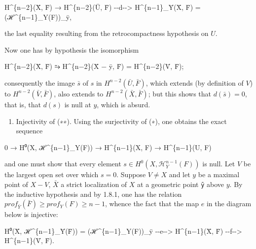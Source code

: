 \documentclass[
  11pt,
  a4paper,
]{book}
\newenvironment{Shaded}{}{}
\newcommand{\NormalTok}[1]{#1}
\providecommand{\tightlist}{%
  \setlength{\itemsep}{0pt}\setlength{\parskip}{0pt}}
\begin{document}
\begin{Shaded}
\begin{Highlighting}[]
\NormalTok{H\^{}\{n−2\}(X̄, F̄) → H\^{}\{n−2\}(Ū, F̄) {-}{-}d{-}{-}\textgreater{} H\^{}\{n−1\}\_Ȳ(X̄, F̄) = (ℋ\^{}\{n−1\}\_Y(F))\_ȳ,}
\end{Highlighting}
\end{Shaded}

the last equality resulting from the retrocompactness hypothesis on
\(U\).

Now one has by hypothesis the isomorphism

\begin{Shaded}
\begin{Highlighting}[]
\NormalTok{H\^{}\{n−2\}(X̄, F̄) ⥲ H\^{}\{n−2\}(X̄ − ȳ, F̄) = H\^{}\{n−2\}(V̄, F̄);}
\end{Highlighting}
\end{Shaded}

consequently the image \(\bar{s}\) of \(s\) in
\(H^{n-2}(\bar{U}, \bar{F})\), which extends (by definition of \(V\)) to
\(H^{n-2}(\bar{V}, \bar{F})\), also extends to
\(H^{n-2}(\bar{X}, \bar{F})\); but this shows that \(d(\bar{s}) = 0\),
that is, that \(d(s)\) is null at \(y\), which is absurd.

\begin{enumerate}
\def\labelenumi{\alph{enumi})}
\setcounter{enumi}{1}
\tightlist
\item
  Injectivity of (∗∗). Using the surjectivity of (∗), one obtains the
  exact sequence
\end{enumerate}

\begin{Shaded}
\begin{Highlighting}[]
\NormalTok{0 → H⁰(X, ℋ\^{}\{n−1\}\_Y(F)) → H\^{}\{n−1\}(X, F) → H\^{}\{n−1\}(U, F)}
\end{Highlighting}
\end{Shaded}

and one must show that every element
\(s \in H^{0}(X, \mathcal{H}^{n-1}_{Y}(F))\) is null. Let \(V\) be the
largest open set over which \(s = 0\). Suppose \(V \neq X\) and let
\(y\) be a maximal point of \(X - V\), \(\bar{X}\) a strict localization
of \(X\) at a geometric point \texttt{ȳ} above \(y\). By the inductive
hypothesis and by 1.8.1, one has the relation
\(prof_{\bar{Y}}(\bar{F}) \geqslant prof_{Y}(F) \geqslant n - 1\),
whence the fact that the map \(e\) in the diagram below is injective:

\begin{Shaded}
\begin{Highlighting}[]
\NormalTok{H⁰(X̄, ℋ\^{}\{n−1\}\_Ȳ(F̄)) = (ℋ\^{}\{n−1\}\_Y(F))\_ȳ {-}{-}e{-}{-}\textgreater{} H\^{}\{n−1\}(X̄, F̄) {-}{-}f{-}{-}\textgreater{} H\^{}\{n−1\}(V̄, F̄).}
\end{Highlighting}
\end{Shaded}
\end{document}
